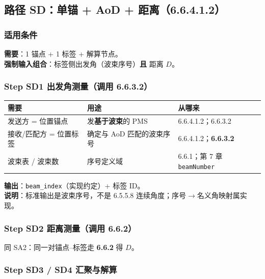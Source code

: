 \documentclass[11pt,a4paper]{ctexart}
\begin{document}
\subsection{路径 SD：单锚 + AoD + 距离（6.6.4.1.2）}
\label{sec:sd}

\subsubsection{适用条件}

\textbf{需要}：1 锚点 + 1 标签 + 解算节点。\\
\textbf{强制输入组合}：标签侧出发角（波束序号）\textbf{且} 距离 $D$。

\subsubsection{Step SD1 出发角测量（调用 6.6.3.2）}

\begin{table}[h]
\centering
\small
\begin{tabular}{L{3.4cm}L{4.8cm}L{4.8cm}}
\toprule
\textbf{需要} & \textbf{用途} & \textbf{从哪来} \\
\midrule
发送方 = 位置锚点 & 发\textbf{基于波束}的 PMS & 6.6.4.1.2；6.6.3.2 \\
接收/匹配方 = 位置标签 & 确定与 AoD 匹配的波束序号 & 6.6.4.1.2；\textbf{6.6.3.2} \\
波束表 / 波束数 & 序号定义域 & 6.6.1；第 7 章 \texttt{beamNumber} \\
\bottomrule
\end{tabular}
\end{table}

\textbf{输出}：\texttt{beam\_index}（实现约定）+ 标签 ID。\\
\textbf{说明}：标准输出是波束序号，不是 6.5.5.8 连续角度；序号$\rightarrow$名义角映射属实现。

\subsubsection{Step SD2 距离测量（调用 6.6.2）}

同 SA2：同一对锚点--标签走 \textbf{6.6.2} 得 $D$。

\subsubsection{Step SD3 / SD4 汇聚与解算}
\end{document}
